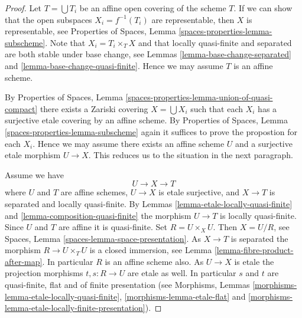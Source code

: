 \begin{proof}
Let $T = \bigcup T_i$ be an affine open covering of the scheme $T$.
If we can show that the open subspaces $X_i = f^{-1}(T_i)$ are
representable, then $X$ is representable, see
Properties of Spaces, Lemma \ref{spaces-properties-lemma-subscheme}.
Note that $X_i = T_i \times_T X$ and that locally quasi-finite and
separated are both stable under base change, see
Lemmas \ref{lemma-base-change-separated} and
\ref{lemma-base-change-quasi-finite}.
Hence we may assume $T$ is an affine scheme.

\medskip\noindent
By
Properties of Spaces,
Lemma \ref{spaces-properties-lemma-union-of-quasi-compact}
there exists a Zariski covering $X = \bigcup X_i$
such that each $X_i$ has a surjective etale covering by
an affine scheme. By
Properties of Spaces, Lemma \ref{spaces-properties-lemma-subscheme}
again it suffices to prove the propostion for each $X_i$.
Hence we may assume there exists an affine scheme $U$ and a
surjective etale morphism $U \to X$. This reduces us to the
situation in the next paragraph.

\medskip\noindent
Assume we have
$$
U \longrightarrow X \longrightarrow T
$$
where $U$ and $T$ are affine schemes, $U \to X$ is etale surjective, and
$X \to T$ is separated and locally quasi-finite. By
Lemmas \ref{lemma-etale-locally-quasi-finite} and
\ref{lemma-composition-quasi-finite}
the morphism $U \to T$ is locally quasi-finite.
Since $U$ and $T$ are affine it is quasi-finite.
Set $R = U \times_X U$. Then $X = U/R$, see
Spaces, Lemma \ref{spaces-lemma-space-presentation}.
As $X \to T$ is separated the
morphism $R \to U \times_T U$ is a closed immersion, see
Lemma \ref{lemma-fibre-product-after-map}.
In particular $R$ is an affine scheme also.
As $U \to X$ is etale the projection morphisms
$t, s : R \to U$ are etale as well. In particular $s$ and $t$ are
quasi-finite, flat and of finite presentation (see
Morphisms, Lemmas \ref{morphisms-lemma-etale-locally-quasi-finite},
\ref{morphisms-lemma-etale-flat} and
\ref{morphisms-lemma-etale-locally-finite-presentation}).


\end{proof}

